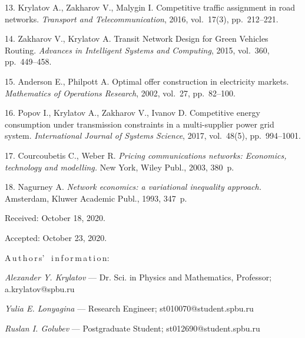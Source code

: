 {13. {Krylatov A., Zakharov V., Malygin I.} Competitive traffic
assignment in road networks. {\it Transport and
Telecommunication}, 2016, vol.~17(3), pp.~212--221.

14. {Zakharov V., Krylatov A.} Transit Network Design for Green
Vehicles Routing. {\it Advances in Intelligent Systems and
Computing}, 2015, vol.~360, pp.~449--458.

15. {Anderson E., Philpott A.} Optimal offer construction in
electricity markets. {\it Mathematics of Operations Research},
2002, vol.~27, pp.~82--100.

16. {Popov I., Krylatov A., Zakharov V., Ivanov D.} Competitive
energy consumption under transmission constraints in a
multi-supplier power grid system. {\it International Journal of
Systems Science}, 2017, vol.~48(5), pp.~994--1001.

17. {Courcoubetis C., Weber R.} \textit{Pricing communications
networks: Economics, technology and modelling.} New York, Wiley
Publ., 2003, 380~p.

18. {Nagurney A.} \textit{Network economics: a variational
inequality approach.} Amsterdam, Kluwer Academic Publ., 1993,
347~p.


\vskip 1.5mm

%


Received:  October 18, 2020.

Accepted: October 23, 2020.

\vskip 4.5mm%
A\,u\,t\,h\,o\,r\,s' \ i\,n\,f\,o\,r\,m\,a\,t\,i\,o\,n:

\vskip 2mm \textit{Alexander Y. Krylatov} ---  Dr. Sci. in Physics
and Mathematics, Professor; %
a.krylatov@spbu.ru

\vskip 2mm \textit{Yulia E. Lonyagina} --- Research Engineer;
st010070@student.spbu.ru

\vskip 2mm \textit{Ruslan I. Golubev} ---  Postgraduate Student;
st012690@student.spbu.ru


}
